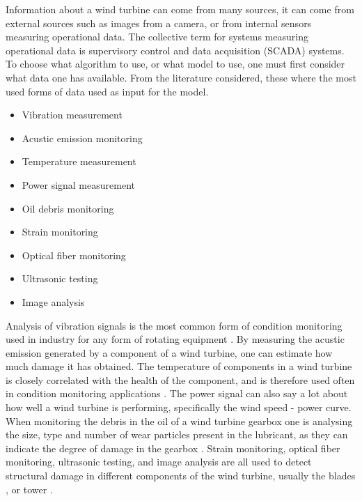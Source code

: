 Information about a wind turbine can come from many sources, it can come from external sources such as images from a camera, or from internal sensors measuring operational data. The collective term for systems measuring operational data is supervisory control and data acquisition (SCADA) systems. To choose what algorithm to use, or what model to use, one must first consider what data one has available. From the literature considered, these where the most used forms of data used as input for the model. 

\begin{itemize}
    \item Vibration measurement  %
    \item Acustic emission monitoring %
    \item Temperature measurement %
    \item Power signal measurement %
    \item Oil debris monitoring %
    \item Strain monitoring %
    \item Optical fiber monitoring %
    \item Ultrasonic testing %
    \item Image analysis
\end{itemize}

Analysis of vibration signals is the most common form of condition monitoring used in industry for any form of rotating equipment \cite{wt_bearing_cm_review}. By measuring the acustic emission generated by a component of a wind turbine, one can estimate how much damage it has obtained. The temperature of components in a wind turbine is closely correlated with the health of the component, and is therefore used often in condition monitoring applications \cite{DBN_chicken_swarm_optim}. The power signal can also say a lot about how well a wind turbine is performing, specifically the wind speed - power curve. When monitoring the debris in the oil of a wind turbine gearbox one is analysing the size, type and number of wear particles present in the lubricant, as they can indicate the degree of damage in the gearbox \cite{cm_rnn_lstm}. Strain monitoring, optical fiber monitoring, ultrasonic testing, and image analysis are all used to detect structural damage in different components of the wind turbine, usually the blades \cite{lin_and_non_lin_feat_for_ice_detection_on_blades, image_based_surface_damage_detection_DL_drone_inspection,image_based_YOLO_YSODA, dirt_n_mud_detection_using_guided_waves,blade_defect_detection_imaging_array, unsupervised_AD_blade_damage_deep_features_images}, or tower \cite{wt_cm_rev_new_trends_chal_2014}.

